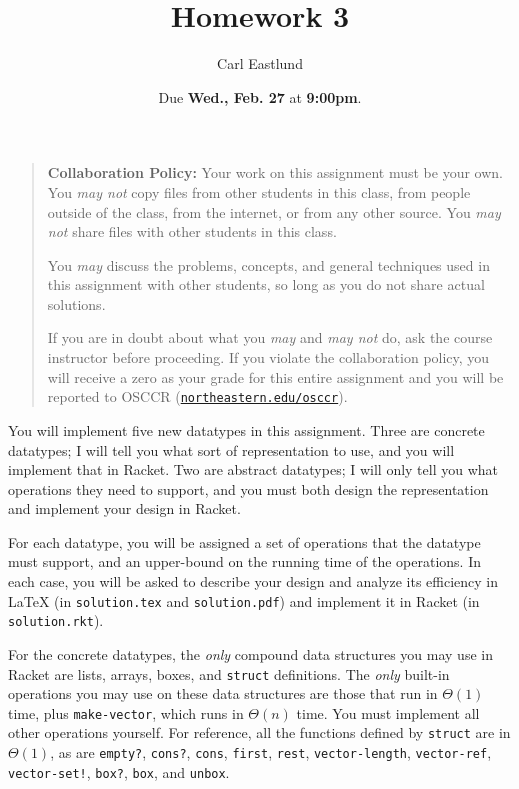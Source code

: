 \documentclass{article}
\title{Homework 3}
\author{Carl Eastlund}
\date{Due \textbf{Wed., Feb. 27} at \textbf{9:00pm}.}
\begin{document}
\maketitle

\newcommand\link[2][http://]{\href{#1#2}{\nolinkurl{#2}}}
\newcommand\http[1]{\link[http://]{#1}}
\newcommand\https[1]{\link[https://]{#1}}
\newcommand\email[1]{\link[mailto:]{#1}}

\begin{quotation}

  \noindent \textbf{Collaboration Policy:} Your work on this assignment must be
  your own.  You \emph{may not} copy files from other students in this class,
  from people outside of the class, from the internet, or from any other source.
  You \emph{may not} share files with other students in this class.

  \medskip

  \noindent You \emph{may} discuss the problems, concepts, and general
  techniques used in this assignment with other students, so long as you do not
  share actual solutions.

  \medskip

  \noindent If you are in doubt about what you \emph{may} and \emph{may not} do,
  ask the course instructor before proceeding.  If you violate the collaboration
  policy, you will receive a zero as your grade for this entire assignment and
  you will be reported to OSCCR (\link{northeastern.edu/osccr}).

\end{quotation}

\bigskip

\newcommand\file\texttt
\newcommand\code\texttt
\newcommand\?{\mbox{\code{?}}}

You will implement five new datatypes in this assignment.  Three are concrete
datatypes; I will tell you what sort of representation to use, and you will
implement that in Racket.  Two are abstract datatypes; I will only tell you what
operations they need to support, and you must both design the representation and
implement your design in Racket.

For each datatype, you will be assigned a set of operations that the datatype
must support, and an upper-bound on the running time of the operations.  In each
case, you will be asked to describe your design and analyze its efficiency in
\LaTeX{} (in \file{solution.tex} and \file{solution.pdf}) and implement it in
Racket (in \file{solution.rkt}).

For the concrete datatypes, the \emph{only} compound data structures you may use
in Racket are lists, arrays, boxes, and \code{struct} definitions.  The
\emph{only} built-in operations you may use on these data structures are those
that run in \(\Theta(1)\) time, plus \code{make-vector}, which runs in
\(\Theta(n)\) time.  You must implement all other operations yourself.  For
reference, all the functions defined by \code{struct} are in \(\Theta(1)\), as
are \code{empty\?}, \code{cons\?}, \code{cons}, \code{first}, \code{rest},
\code{vector-length}, \code{vector-ref}, \code{vector-set!}, \code{box\?},
\code{box}, and \code{unbox}.
\end{document}

